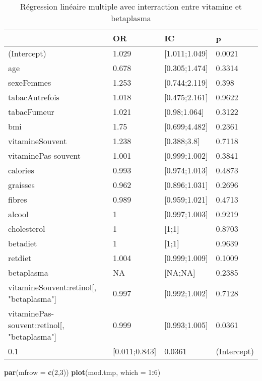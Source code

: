 \documentclass[]{article}
\newenvironment{Shaded}{\begin{snugshade}}{\end{snugshade}}
\newcommand{\KeywordTok}[1]{\textcolor[rgb]{0.13,0.29,0.53}{\textbf{#1}}}
\newcommand{\DataTypeTok}[1]{\textcolor[rgb]{0.13,0.29,0.53}{#1}}
\newcommand{\DecValTok}[1]{\textcolor[rgb]{0.00,0.00,0.81}{#1}}
\newcommand{\OperatorTok}[1]{\textcolor[rgb]{0.81,0.36,0.00}{\textbf{#1}}}
\newcommand{\NormalTok}[1]{#1}
\begin{document}
\begin{table}

\caption{\label{tab:unnamed-chunk-87}Régression linéaire multiple avec interraction entre vitamine et betaplasma}
\centering
\begin{tabular}[t]{l|l|l|l}
\hline
  & OR & IC & p\\
\hline
\rowcolor[HTML]{BBD2E1}  (Intercept) & 1.029 & [1.011;1.049] & 0.0021\\
\hline
age & 0.678 & [0.305;1.474] & 0.3314\\
\hline
\rowcolor[HTML]{BBD2E1}  sexeFemmes & 1.253 & [0.744;2.119] & 0.398\\
\hline
tabacAutrefois & 1.018 & [0.475;2.161] & 0.9622\\
\hline
\rowcolor[HTML]{BBD2E1}  tabacFumeur & 1.021 & [0.98;1.064] & 0.3122\\
\hline
bmi & 1.75 & [0.699;4.482] & 0.2361\\
\hline
\rowcolor[HTML]{BBD2E1}  vitamineSouvent & 1.238 & [0.388;3.8] & 0.7118\\
\hline
vitaminePas-souvent & 1.001 & [0.999;1.002] & 0.3841\\
\hline
\rowcolor[HTML]{BBD2E1}  calories & 0.993 & [0.974;1.013] & 0.4873\\
\hline
graisses & 0.962 & [0.896;1.031] & 0.2696\\
\hline
\rowcolor[HTML]{BBD2E1}  fibres & 0.989 & [0.959;1.021] & 0.4713\\
\hline
alcool & 1 & [0.997;1.003] & 0.9219\\
\hline
\rowcolor[HTML]{BBD2E1}  cholesterol & 1 & [1;1] & 0.8703\\
\hline
betadiet & 1 & [1;1] & 0.9639\\
\hline
\rowcolor[HTML]{BBD2E1}  retdiet & 1.004 & [0.999;1.009] & 0.1009\\
\hline
betaplasma & NA & [NA;NA] & 0.2385\\
\hline
\rowcolor[HTML]{BBD2E1}  vitamineSouvent:retinol[, "betaplasma"] & 0.997 & [0.992;1.002] & 0.7128\\
\hline
vitaminePas-souvent:retinol[, "betaplasma"] & 0.999 & [0.993;1.005] & 0.0361\\
\hline
\rowcolor[HTML]{BBD2E1}  0.1 & [0.011;0.843] & 0.0361 & (Intercept)\\
\hline
\end{tabular}
\end{table}

\begin{Shaded}
\begin{Highlighting}[]
\KeywordTok{par}\NormalTok{(}\DataTypeTok{mfrow =} \KeywordTok{c}\NormalTok{(}\DecValTok{2}\NormalTok{,}\DecValTok{3}\NormalTok{))}
\KeywordTok{plot}\NormalTok{(mod.tmp, }\DataTypeTok{which =} \DecValTok{1}\OperatorTok{:}\DecValTok{6}\NormalTok{)}
\end{Highlighting}
\end{Shaded}
\end{document}
